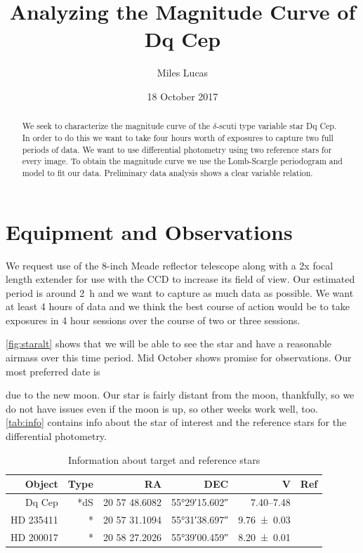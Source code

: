 \documentclass[]{article}
\title{Analyzing the Magnitude Curve of Dq Cep}
\author{Miles Lucas}
\begin{document}
\maketitle

\begin{abstract}
	We seek to characterize the magnitude curve of the $\delta$-scuti type variable star Dq Cep. In order to do this we want to take four hours worth of exposures to capture two full periods of data. We want to use differential photometry using two reference stars for every image. To obtain the magnitude curve we use the Lomb-Scargle periodogram and model to fit our data. Preliminary data analysis shows a clear variable relation.
\end{abstract}

\section{Equipment and Observations}
	We request use of the 8-inch Meade reflector telescope along with a 2x focal length extender for use with the CCD to increase its field of view. Our estimated period is around \SI{2}{\hour} and we want to capture as much data as possible. We want at least 4 hours of data and we think the best course of action would be to take exposures in 4 hour sessions over the course of two or three sessions. 
	
	\autoref{fig:staralt} shows that we will be able to see the star and have a reasonable airmass over this time period. Mid October shows promise for observations. Our most preferred date is \date{18 October 2017} due to the new moon. Our star is fairly distant from the moon, thankfully, so we do not have issues even if the moon is up, so other weeks work well, too. \autoref{tab:info} contains info about the star of interest and the reference stars for the differential photometry.
	
	\begin{table}[p]
		\centering
		\caption{Information about target and reference stars}
		\begin{tabular}{rrrrrr}
			\hline
			   Object & Type &            RA &                DEC &                      V &                        Ref \\ \hline\hline
			   Dq Cep &  *dS & 20 57 48.6082 & \ang{55;29;15.602} & \SIrange{7.40}{7.48}{} & \cite{1971GCVS3.C......0K} \\
			HD 235411 &    * & 20 57 31.1094 & \ang{55;31;38.697} &     \SI{9.76\pm0.03}{} &  \cite{2000AA...355L..27H} \\
			HD 200017 &    * & 20 58 27.2026 & \ang{55;39;00.459} &     \SI{8.20\pm0.01}{} &  \cite{2000AA...355L..27H} \\ \hline
		\end{tabular}
		\label{tab:info}
	\end{table}
	
\end{document}
